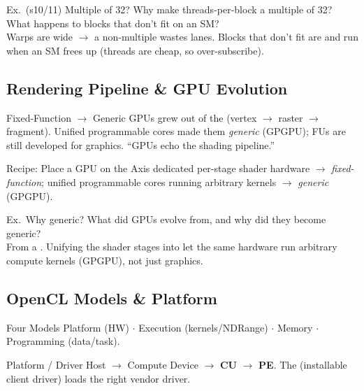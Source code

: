 \begin{example2}{Ex.\ (s10/11) Multiple of 32?}
    Why make threads-per-block a multiple of 32? What happens to blocks that don't fit on an SM?
     \\ 
    Warps are  wide $\to$ a non-multiple wastes lanes. Blocks that don't fit are  and run when an SM frees up (threads are cheap, so over-subscribe).
\end{example2}

\subsection{Rendering Pipeline \& GPU Evolution}

\begin{concept}{Fixed-Function $\to$ Generic}
    GPUs grew out of the  (vertex $\to$ raster $\to$ fragment). Unified programmable cores made them \emph{generic} (GPGPU); FUs are still developed for graphics. ``GPUs echo the shading pipeline.''
\end{concept}

\begin{KR}{Recipe: Place a GPU on the Axis}
    dedicated per-stage shader hardware $\to$ \emph{fixed-function}; unified programmable cores running arbitrary kernels $\to$ \emph{generic} (GPGPU).
\end{KR}

\begin{example2}{Ex.\ Why generic?}
    What did GPUs evolve from, and why did they become generic?
     \\ 
    From a . Unifying the shader stages into  let the same hardware run arbitrary compute kernels (GPGPU), not just graphics.
\end{example2}

\subsection{OpenCL Models \& Platform}


\begin{definition}{Four Models}
    Platform (HW) $\cdot$ Execution (kernels/NDRange) $\cdot$ Memory $\cdot$ Programming (data/task).
\end{definition}

\begin{definition}{Platform / Driver}
    Host $\to$ Compute Device $\to$ \textbf{CU} $\to$ \textbf{PE}. The  (installable client driver) loads the right vendor driver.
\end{definition}

